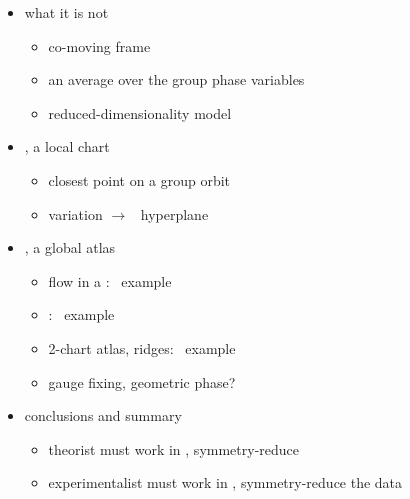 \begin{itemize}
\begin{itemize}
      \item \mslices
    \end{itemize}
  \item what it is not
    \begin{itemize}
      \item co-moving frame
      \item an average over the group phase variables
      \item reduced-dimensionality model
    \end{itemize}
  \item \mslices, a local chart
    \begin{itemize}
      \item closest point on a group orbit
      \item variation $\to$ \slice\ hyperplane
    \end{itemize}
  \item \mslices, a global atlas
    \begin{itemize}
      \item flow in a \slice: \cLf\ example
      \item {\chartBord}: \cLf\ example
      \item 2-chart atlas, ridges:  \cLf\ example
      \item gauge fixing, geometric phase?
    \end{itemize}
  \item conclusions and summary
      \begin{itemize}
      \item theorist must work in \statesp, symmetry-reduce
      \item experimentalist must work in \statesp,
            symmetry-reduce the data
      \end{itemize}
\end{itemize}

